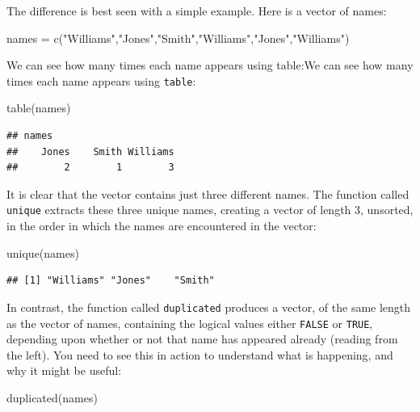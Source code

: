 \documentclass[
]{book}
\newenvironment{Shaded}{\begin{snugshade}}{\end{snugshade}}
\newcommand{\FunctionTok}[1]{\textcolor[rgb]{0.00,0.00,0.00}{#1}}
\newcommand{\NormalTok}[1]{#1}
\newcommand{\OtherTok}[1]{\textcolor[rgb]{0.56,0.35,0.01}{#1}}
\newcommand{\StringTok}[1]{\textcolor[rgb]{0.31,0.60,0.02}{#1}}
\begin{document}
The difference is best seen with a simple example. Here is a vector of names:

\begin{Shaded}
\begin{Highlighting}[]
\NormalTok{names }\OtherTok{=} \FunctionTok{c}\NormalTok{(}\StringTok{"Williams"}\NormalTok{,}\StringTok{"Jones"}\NormalTok{,}\StringTok{"Smith"}\NormalTok{,}\StringTok{"Williams"}\NormalTok{,}\StringTok{"Jones"}\NormalTok{,}\StringTok{"Williams"}\NormalTok{)}
\end{Highlighting}
\end{Shaded}

We can see how many times each name appears using table:We can see how many times each name appears using \texttt{table}:

\begin{Shaded}
\begin{Highlighting}[]
\FunctionTok{table}\NormalTok{(names)}
\end{Highlighting}
\end{Shaded}

\begin{verbatim}
## names
##    Jones    Smith Williams 
##        2        1        3
\end{verbatim}

It is clear that the vector contains just three different names. The function called \texttt{unique} extracts these three unique names, creating a vector of length 3, unsorted, in the order in which the names are encountered in the vector:

\begin{Shaded}
\begin{Highlighting}[]
\FunctionTok{unique}\NormalTok{(names)}
\end{Highlighting}
\end{Shaded}

\begin{verbatim}
## [1] "Williams" "Jones"    "Smith"
\end{verbatim}

In contrast, the function called \texttt{duplicated} produces a vector, of the same length as the vector of names, containing the logical values either \texttt{FALSE} or \texttt{TRUE}, depending upon whether or not that name has appeared already (reading from the left). You need to see this in action to understand what is happening, and why it might be useful:

\begin{Shaded}
\begin{Highlighting}[]
\FunctionTok{duplicated}\NormalTok{(names)}
\end{Highlighting}
\end{Shaded}
\end{document}
